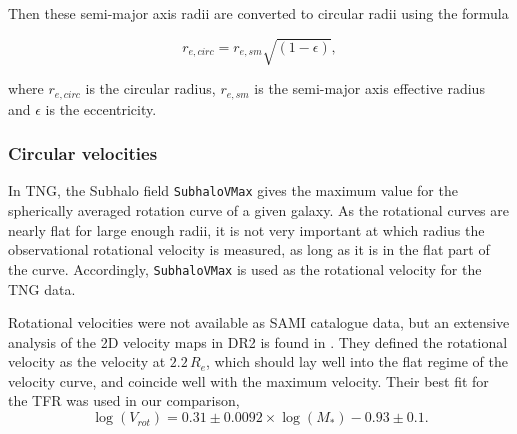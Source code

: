 Then these semi-major axis radii are converted to circular radii using the formula

\begin{equation}
   r_{e, circ} = r_{e, sm}\sqrt{(1-\epsilon)},
\end{equation}

where $r_{e, circ}$ is the circular radius, $r_{e,sm}$ is the semi-major axis effective radius and $\epsilon$ is the eccentricity.

\subsubsection{Circular velocities}
In TNG, the Subhalo field \texttt{SubhaloVMax} gives the maximum value for the spherically averaged rotation curve of a given galaxy. As the rotational curves are nearly flat for large enough radii, it is not very important at which radius the observational rotational velocity is measured, as long as it is in the flat part of the curve. Accordingly, \texttt{SubhaloVMax} is used as the rotational velocity for the TNG data.

Rotational velocities were not available as SAMI catalogue data, but an extensive analysis of the 2D velocity maps in DR2 is found in \textcite{Bloom2017}. They defined the rotational velocity as the velocity at $2.2\, R_e$, which should lay well into the flat regime of the velocity curve, and coincide well with the maximum velocity. Their best fit for the TFR was used in our comparison, 
\begin{equation}
	\log(V_{rot}) = 0.31 \pm 0.0092 \times \log(M_*)-0.93 \pm 0.1.
\end{equation}
